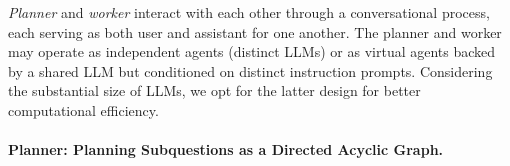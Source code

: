 \emph{Planner} and \emph{worker} interact with each other through a conversational process, each serving as both user and assistant for one another. 
The planner and worker may operate as independent agents (distinct LLMs) or as virtual agents backed by a shared LLM but conditioned on distinct instruction prompts. 
Considering the substantial size of LLMs, we opt for the latter design for better computational efficiency.


\paragraph{Planner: Planning Subquestions as a Directed Acyclic Graph.}








